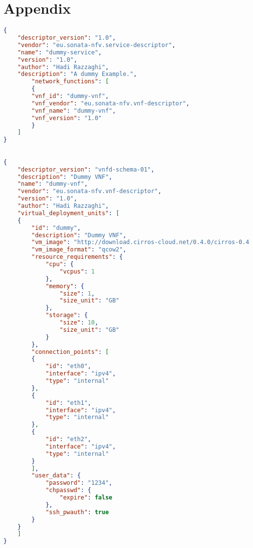 \appendix
\chapter{Appendix}
\label{ch:Appendix}

\begin{lstlisting}[language=json,caption=NSD]
{
	"descriptor_version": "1.0",
	"vendor": "eu.sonata-nfv.service-descriptor",
	"name": "dummy-service",
	"version": "1.0",
	"author": "Hadi Razzaghi",
	"description": "A dummy Example.",
		"network_functions": [
		{
		"vnf_id": "dummy-vnf",
		"vnf_vendor": "eu.sonata-nfv.vnf-descriptor",
		"vnf_name": "dummy-vnf",
		"vnf_version": "1.0"
		}
	]
}
\end{lstlisting}

\begin{lstlisting}[language=json, caption=VNFD]

{
	"descriptor_version": "vnfd-schema-01",
	"description": "Dummy VNF",
	"name": "dummy-vnf",
	"vendor": "eu.sonata-nfv.vnf-descriptor",
	"version": "1.0",
	"author": "Hadi Razzaghi",
	"virtual_deployment_units": [
	{
		"id": "dummy",
		"description": "Dummy VNF",
		"vm_image": "http://download.cirros-cloud.net/0.4.0/cirros-0.4.0-x86_64-disk.img",
		"vm_image_format": "qcow2",
		"resource_requirements": {
			"cpu": {
				"vcpus": 1
			},
			"memory": {
				"size": 1,
				"size_unit": "GB"
			},
			"storage": {
				"size": 10,
				"size_unit": "GB"
			}
		},
		"connection_points": [
		{
			"id": "eth0",
			"interface": "ipv4",
			"type": "internal"
		},
		{
			"id": "eth1",
			"interface": "ipv4",
			"type": "internal"
		},
		{
			"id": "eth2",
			"interface": "ipv4",
			"type": "internal"
		}
		],
		"user_data": {
			"password": "1234",
			"chpasswd": {
				"expire": false
			},
			"ssh_pwauth": true
		}
	}
	]
}
\end{lstlisting}